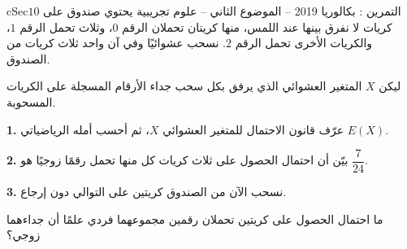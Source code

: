 \documentclass[12pt,a4paper]{article}
\newenvironment{BOX}[2]{\begin{otherlanguage}{english}\begin{arbox}{#1}{#2}}{\end{arbox}\end{otherlanguage}}
\newcounter{exo}
\newenvironment{tamrin}[1]{\stepcounter{exo}\begin{BOX}{cSec}{التمرين \theexo: #1}}{\end{BOX}}
\newcommand{\QQ}[1]{\par\smallskip\textbf{#1.} }
\begin{document}
\begin{tamrin}{بكالوريا 2019 -- الموضوع الثاني -- علوم تجريبية}
يحتوي صندوق على $10$ كريات لا نفرق بينها عند اللمس، منها كريتان تحملان الرقم $0$، وثلاث تحمل الرقم $1$، والكريات الأخرى تحمل الرقم $2$. نسحب عشوائيًا وفي آن واحد ثلاث كريات من الصندوق.

ليكن $X$ المتغير العشوائي الذي يرفق بكل سحب جداء الأرقام المسجلة على الكريات المسحوبة.
\QQ{1} عرّف قانون الاحتمال للمتغير العشوائي $X$، ثم أحسب أمله الرياضياتي $E(X)$.
\QQ{2} بيّن أن احتمال الحصول على ثلاث كريات كل منها تحمل رقمًا زوجيًا هو $\dfrac{7}{24}$.
\QQ{3} نسحب الآن من الصندوق كريتين على التوالي دون إرجاع.

ما احتمال الحصول على كريتين تحملان رقمين مجموعهما فردي علمًا أن جداءهما زوجي؟
\end{tamrin}
\end{document}
